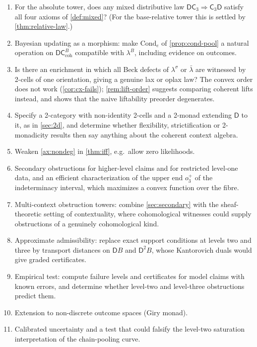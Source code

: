 \documentclass[11pt]{article}
\theoremstyle{definition}
\theoremstyle{remark}
\newcommand{\D}{\mathsf{D}}
\newcommand{\Cond}{\mathrm{Cond}}
\newcommand{\C}{\mathsf{C}}
\newcommand{\lb}{\bar\lambda}
\newcommand{\ls}{\lambda^{\sigma}}
\begin{document}
\begin{enumerate}[leftmargin=*]
\item For the absolute tower, does any mixed distributive law $\D\C_3\Rightarrow\C_3\D$ satisfy
  all four axioms of \cref{def:mixed}? (For the base-relative tower this is settled by
  \cref{thm:relative-law}.)
\item Bayesian updating as a morphism: make $\Cond_e$ of \cref{prop:cond-pool} a natural operation
  on $\D\C^B_{\mathrm{coh}}$ compatible with $\lambda^B$, including evidence on outcomes.
\item Is there an enrichment in which all Beck defects of $\ls$ or $\lb$ are witnessed by 2-cells of
  one orientation, giving a genuine lax or oplax law? The convex order does not work
  (\cref{cor:cx-fails}); \cref{rem:lift-order} suggests comparing coherent lifts instead, and shows
  that the naive liftability preorder degenerates.
\item Specify a 2-category with non-identity 2-cells and a 2-monad extending $\D$ to it, as in
  \cref{sec:2d}, and determine whether flexibility, strictification or 2-monadicity results then say
  anything about the coherent context algebra.
\item Weaken \cref{ax:nondeg} in \cref{thm:iff}, e.g.\ allow zero likelihoods.
\item Secondary obstructions for higher-level claims and for restricted level-one data, and an
  efficient characterization of the upper end $o_3^+$ of the indeterminacy interval, which maximizes a
  convex function over the fibre.
\item Multi-context obstruction towers: combine \cref{sec:secondary} with the sheaf-theoretic
  setting of contextuality, where cohomological witnesses \cite{AbramskyMansfieldBarbosa2012} could
  supply obstructions of a genuinely cohomological kind.
\item Approximate admissibility: replace exact support conditions at levels two and three by
  transport distances on $\D B$ and $\D^2B$, whose Kantorovich duals would give graded certificates.
\item Empirical test: compute failure levels and certificates for model claims with known errors, and
  determine whether level-two and level-three obstructions predict them.
\item Extension to non-discrete outcome spaces (Giry monad).
\item Calibrated uncertainty and a test that could falsify the level-two saturation interpretation of
  the chain-pooling curve.
\end{enumerate}
\end{document}
